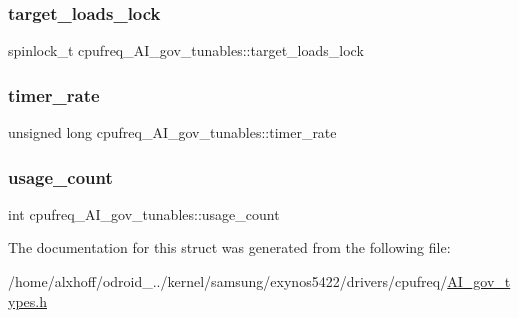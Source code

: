 \subsubsection{\texorpdfstring{target\+\_\+loads\+\_\+lock}{target\_loads\_lock}}
{\footnotesize\ttfamily spinlock\+\_\+t cpufreq\+\_\+\+A\+I\+\_\+gov\+\_\+tunables\+::target\+\_\+loads\+\_\+lock}

\mbox{\label{structcpufreq__AI__gov__tunables_ae2890ab33e5f75ebd016237f0838b913}} 
\subsubsection{\texorpdfstring{timer\+\_\+rate}{timer\_rate}}
{\footnotesize\ttfamily unsigned long cpufreq\+\_\+\+A\+I\+\_\+gov\+\_\+tunables\+::timer\+\_\+rate}

\mbox{\label{structcpufreq__AI__gov__tunables_aa3d244826e696ed22f060f41860b731e}} 
\subsubsection{\texorpdfstring{usage\+\_\+count}{usage\_count}}
{\footnotesize\ttfamily int cpufreq\+\_\+\+A\+I\+\_\+gov\+\_\+tunables\+::usage\+\_\+count}



The documentation for this struct was generated from the following file\+:\begin{DoxyCompactItemize}
\item 
/home/alxhoff/odroid\+\_../kernel/samsung/exynos5422/drivers/cpufreq/\hyperlink{AI__gov__types_8h}{A\+I\+\_\+gov\+\_\+types.\+h}\end{DoxyCompactItemize}
